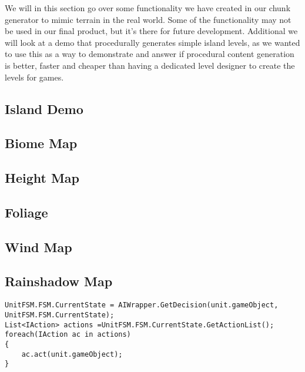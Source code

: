 We will in this section go over some functionality we have created in our chunk generator to mimic terrain in the real world. Some of the functionality may not be used in our final product, but it's there for future development. Additional we will look at a demo that procedurally generates simple island levels, as we wanted to use this as a way to demonstrate and answer if procedural content generation is better, faster and cheaper than having a dedicated level designer to create the levels for games.


\subsection{Island Demo}

\subsection{Biome Map}

\subsection{Height Map}

\subsection{Foliage}

\subsection{Wind Map}

\subsection{Rainshadow Map}

\begin{lstlisting}[caption = The Update() call from the turn manager., label=code:aicall, language=Csharp]
UnitFSM.FSM.CurrentState = AIWrapper.GetDecision(unit.gameObject, UnitFSM.FSM.CurrentState);
List<IAction> actions =UnitFSM.FSM.CurrentState.GetActionList();
foreach(IAction ac in actions)
{
	ac.act(unit.gameObject);
}
\end{lstlisting}